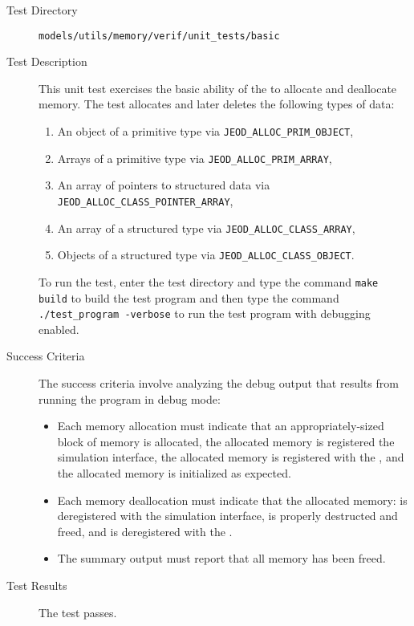 \label{test:basic}
\begin{description}
\item[Test Directory]
{\tt models/utils/memory/verif/unit\_tests/basic}

\item[Test Description] This unit test exercises 
the basic ability of the \ModelDesc to allocate and deallocate memory.
The test allocates and later deletes the following types of data:
\begin{enumerate}
\item An object of a primitive type via {\tt JEOD\_ALLOC\_PRIM\_OBJECT},
\item Arrays of a primitive type via {\tt JEOD\_ALLOC\_PRIM\_ARRAY},
\item An array of pointers to structured data
  via {\tt JEOD\_ALLOC\_CLASS\_POINTER\_ARRAY},
\item An array of a structured type via {\tt JEOD\_ALLOC\_CLASS\_ARRAY},
\item Objects of a structured type via {\tt JEOD\_ALLOC\_CLASS\_OBJECT}.
\end{enumerate}

To run the test, enter the test directory and type the command
{\tt make build} to build the test program and then type the command
{\tt ./test\_program -verbose} to run the test program with debugging
enabled.

\item[Success Criteria]
The success criteria involve analyzing the debug output that results
from running the program in debug mode:
\begin{itemize}
\item Each memory allocation must indicate that
an appropriately-sized block of memory is allocated,
the allocated memory is registered the simulation interface,
the allocated memory is registered with the \ModelDesc, and
the allocated memory is initialized as expected.

\item Each memory deallocation must indicate that
the allocated memory: is deregistered with the simulation interface,
is properly destructed and freed, and
is deregistered with the \ModelDesc.

\item The summary output must report that all memory has been freed.
\end{itemize}

\item[Test Results]
The test passes.


\end{description}
